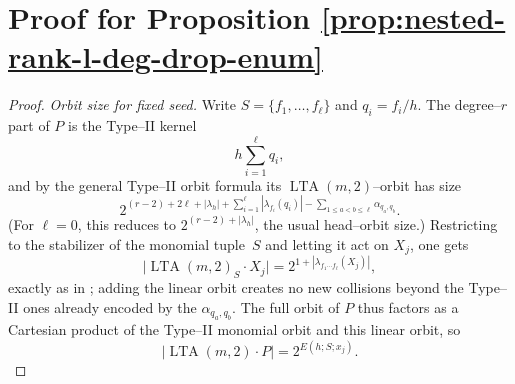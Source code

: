 \documentclass[conference]{IEEEtran}
\theoremstyle{definition}
\DeclareMathOperator{\LTA}{LTA}
\newcommand{\wt}{\operatorname{wt}}
\newcommand{\ev}{\operatorname{ev}}
\begin{document}
\section{Proof for Proposition \ref{prop:nested-rank-l-deg-drop-enum}}%

\begin{proof}

\emph{Orbit size for fixed seed.}
Write $S=\{f_1,\dots,f_\ell\}$ and $q_i=f_i/h$.  The degree–$r$ part of
$P$ is the Type–II kernel \cite[Thm.~2]%
{rowshan2025weight}
\[
h\sum_{i=1}^{\ell}q_i,
\]
and by the general Type–II orbit formula
\cite[Prop.~3, Thm.~5]{rowshan2025weight} its $\LTA(m,2)$–orbit has
size
\[
2^{(r-2)+2\ell+|\lambda_h|
   +\sum_{i=1}^{\ell}|\lambda_{f_i}(q_i)|
   -\sum_{1\le a<b\le\ell}\alpha_{q_a,q_b}}.
\]
(For $\ell=0$, this reduces to $2^{(r-2)+|\lambda_h|}$, the usual
head–orbit size.)  Restricting to the stabilizer of the monomial
tuple~$S$ and letting it act on $X_j$, one gets
\[
\bigl|\LTA(m,2)_S\cdot X_j\bigr|
=
2^{1+|\lambda_{f_1\cdots f_{\ell}}(X_j)|},
\]
exactly as in \cite[Lemma~5, Thm.~6]{rowshan2025weight}; adding the
linear orbit creates no new collisions beyond the Type–II ones already
encoded by the $\alpha_{q_a,q_b}$.  The full orbit of $P$ thus factors
as a Cartesian product of the Type–II monomial orbit and this linear
orbit, so
\[
\bigl|\LTA(m,2)\cdot P\bigr|
=
2^{E(h;S;x_j)}.
\]


\end{proof}
\end{document}
